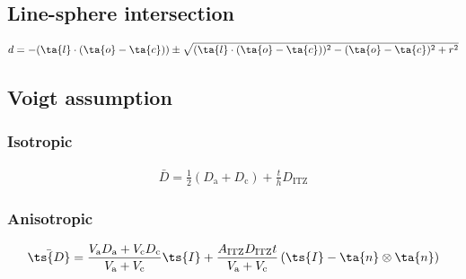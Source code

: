 \documentclass[12pt]{article}
\begin{document}
\subsection{Line-sphere intersection}

\begin{align}
d = -(\ta{l}\cdot(\ta{o}-\ta{c})) \pm \sqrt{(\ta{l}\cdot(\ta{o}-\ta{c}))^2 - (\ta{o}-\ta{c})^2 +r^2}
\end{align}

\subsection{Voigt assumption}

\subsubsection{Isotropic}
\begin{align}
\bar{D} = \frac{1}{2}(D_\text{a}+D_\text{c}) + \frac{t}{h}D_\text{ITZ}
\end{align}

\subsubsection{Anisotropic}
\begin{align}
\bar{\ts{D}} = \frac{V_\text{a}D_\text{a} + V_\text{c}D_\text{c}}{V_\text{a}+V_\text{c}}\ts{I} + \frac{A_\text{ITZ}D_\text{ITZ}t}{V_\text{a}+V_\text{c}}\left(\ts{I} - \ta{n}\otimes\ta{n}\right)
\end{align}
\end{document}
